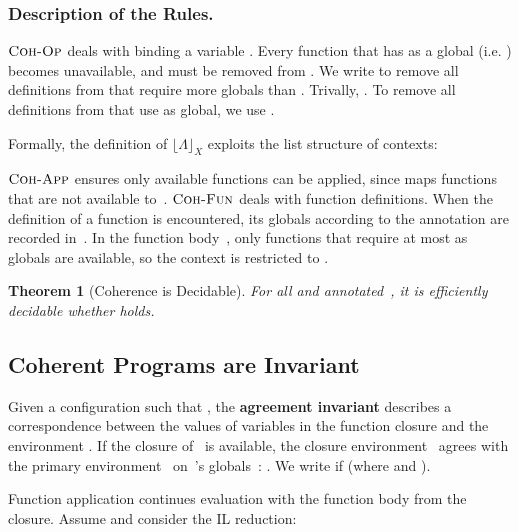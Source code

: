 \documentclass[openright,a4paper,11pt]{scrartcl}
\newcommand{\nrule}[1]{\ensuremath{\textup{\textsc{#1}}}}
\newcommand{\LT}{\ensuremath{\Lambda}}
\newcommand{\restrict}[2]{\ensuremath{\lfloor#1\rfloor_{#2}}}
\theoremstyle{plain}
\newtheorem{theorem}{Theorem}
\theoremstyle{plain}
\theoremstyle{plain}
\theoremstyle{plain}
\theoremstyle{nonumberplain}
\begin{document}
\subsubsection{Description of the Rules.}
\nrule{Coh-Op} deals with binding a variable .
Every function that has  as a global (i.e. ) becomes unavailable, and must be removed from .
We write  to remove all definitions from  that require more globals than . Trivally, .
To remove all definitions from  that use  as global, we use .

Formally, the definition of \restrict{\LT}{X} exploits the list structure of contexts:
\begin{center}
\begin{minipage}{.4\textwidth}

\end{minipage}
\begin{minipage}{.55\textwidth}

\end{minipage}
\end{center}
\nrule{Coh-App} ensures only available functions can be applied, since  maps functions that are not available to~.
\nrule{Coh-Fun} deals with function definitions.
When the definition of a function  is encountered, its globals   according to the annotation are recorded in~.
In the function body~, only functions that require at most  as globals are available, so the
context is restricted to .




\begin{theorem}[Coherence is Decidable]
  For all  and annotated~, it is efficiently decidable whether  holds.
\label{thm:coh_dec}
\end{theorem}












\subsection{Coherent Programs are Invariant}
Given a configuration  such that , the \textbf{agreement invariant} describes a correspondence between the values of variables in the function closure  and the environment .
If the closure of~ is available, the closure environment~ agrees with the primary environment~ on~'s globals~: {}.
We write  if  (where  and  ).

Function application continues evaluation with the function body from the closure.
Assume  and consider the IL reduction:
\end{document}
